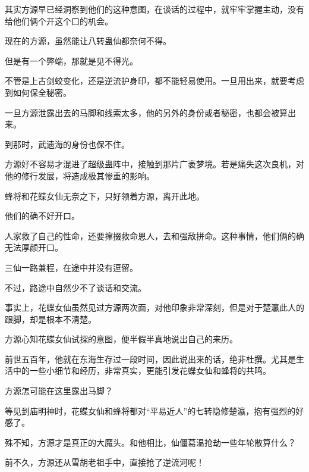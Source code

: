 \begin{this_body}
其实方源早已经洞察到他们的这种意图，在谈话的过程中，就牢牢掌握主动，没有给他们俩个开这个口的机会。

现在的方源，虽然能让八转蛊仙都奈何不得。

但是有一个弊端，那就是见不得光。

不管是上古剑蛟变化，还是逆流护身印，都不能轻易使用。一旦用出来，就要考虑到如何保全秘密。

一旦方源泄露出去的马脚和线索太多，他的另外的身份或者秘密，也都会被算出来。

到那时，武遗海的身份也保不住。

方源好不容易才混进了超级蛊阵中，接触到那片广袤梦境。若是痛失这次良机，对他的修行发展，将造成极其惨重的影响。

蜂将和花蝶女仙无奈之下，只好领着方源，离开此地。

他们的确不好开口。

人家救了自己的性命，还要撺掇救命恩人，去和强敌拼命。这种事情，他们俩的确无法厚颜开口。

三仙一路兼程，在途中并没有逗留。

不过，路途中自然少不了谈话和交流。

事实上，花蝶女仙虽然见过方源两次面，对他印象非常深刻，但是对于楚瀛此人的跟脚，却是根本不清楚。

方源心知花蝶女仙试探的意图，便半假半真地说出自己的来历。

前世五百年，他就在东海生存过一段时间，因此说出来的话，绝非杜撰。尤其是生活中的一些小细节和经历，非常真实，更能引发花蝶女仙和蜂将的共鸣。

方源怎可能在这里露出马脚？

等见到庙明神时，花蝶女仙和蜂将都对“平易近人”的七转隐修楚瀛，抱有强烈的好感了。

殊不知，方源才是真正的大魔头。和他相比，仙僵葛温抢劫一些年轮散算什么？

前不久，方源还从雪胡老祖手中，直接抢了逆流河呢！

\end{this_body}

